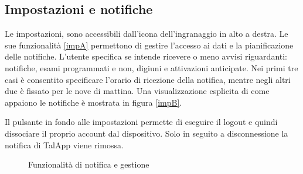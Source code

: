 \documentclass[12pt,a4paper,openright,twoside]{report}
\begin{document}
\subsection{Impostazioni e notifiche}
Le impostazioni, sono accessibili dall'icona dell'ingranaggio in alto a destra. Le sue funzionalità \ref{impA} permettono di gestire l'accesso ai dati e la pianificazione delle notifiche. L'utente specifica se intende ricevere o meno avvisi riguardanti: notifiche, esami programmati e non, digiuni e attivazioni anticipate. Nei primi tre casi è consentito specificare l'orario di ricezione della notifica, mentre negli altri due è fissato per le nove di mattina. Una visualizzazione esplicita di come appaiono le notifiche è mostrata in figura \ref{impB}.

Il pulsante in fondo alle impostazioni permette di eseguire il logout e quindi dissociare il proprio account dal dispositivo. Solo in seguito a disconnessione la notifica di TalApp viene rimossa.


\begin{figure}[H]
\centering
{} \quad
{} \quad
\caption{Funzionalità di notifica e gestione}
\label{impC}
\end{figure}
\end{document}
